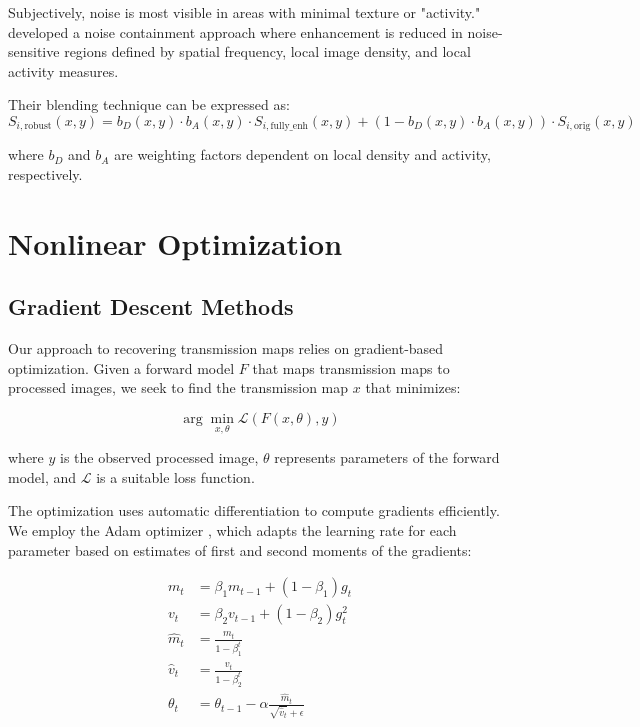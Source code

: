 \documentclass[nomenclature, english, bibtex]{kththesis}
\numberwithin{listing}{chapter}
\begin{document}
Subjectively, noise is most visible in areas with minimal texture or "activity." \cite{stahl2000digital} developed a noise containment approach where enhancement is reduced in noise-sensitive regions defined by spatial frequency, local image density, and local activity measures.

Their blending technique can be expressed as:
\begin{equation}
S_{i, \text{robust}}(x,y) = b_D(x,y) \cdot b_A(x,y) \cdot S_{i, \text{fully\_enh}}(x,y) + (1 - b_D(x,y) \cdot b_A(x,y)) \cdot S_{i, \text{orig}}(x,y)
\end{equation}

where $b_D$ and $b_A$ are weighting factors dependent on local density and activity, respectively.

\section{Nonlinear Optimization}
\subsection{Gradient Descent Methods}
Our approach to recovering transmission maps relies on gradient-based optimization. Given a forward model $F$ that maps transmission maps to processed images, we seek to find the transmission map $x$ that minimizes:

\begin{equation}
\arg\min_{x, \theta} \mathcal{L}(F(x, \theta), y)
\end{equation}

where $y$ is the observed processed image, $\theta$ represents parameters of the forward model, and $\mathcal{L}$ is a suitable loss function.

The optimization uses automatic differentiation to compute gradients efficiently. We employ the Adam optimizer \cite{kingma2014adam}, which adapts the learning rate for each parameter based on estimates of first and second moments of the gradients:

\begin{align}
m_t &= \beta_1 m_{t-1} + (1 - \beta_1) g_t \\
v_t &= \beta_2 v_{t-1} + (1 - \beta_2) g_t^2 \\
\hat{m}_t &= \frac{m_t}{1 - \beta_1^t} \\
\hat{v}_t &= \frac{v_t}{1 - \beta_2^t} \\
\theta_t &= \theta_{t-1} - \alpha \frac{\hat{m}_t}{\sqrt{\hat{v}_t} + \epsilon}
\end{align}
\end{document}

